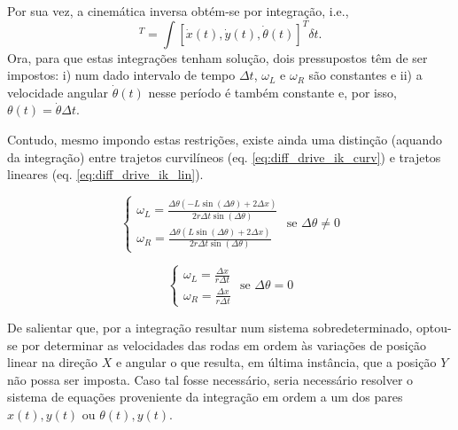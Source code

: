 \documentclass[twocolumn]{article}
\begin{document}
Por sua vez, a cinemática inversa obtém-se por integração, i.e., 
\begin{equation*}
    [x(t), y(t), \theta (t)]^T = \int [\dot{x}(t), \dot{y}(t), \dot{\theta}(t)]^T \delta t .
\end{equation*}
Ora, para que estas integrações tenham solução, dois pressupostos têm de ser impostos: i) num dado intervalo de tempo $\Delta t$, $\omega_L$ e $\omega_R$ são constantes e ii) a velocidade angular $\dot{\theta}(t)$ nesse período é também constante e, por isso, $\theta (t) = \dot{\theta} \Delta t$. 

Contudo, mesmo impondo estas restrições, existe ainda uma distinção (aquando da integração) entre trajetos curvilíneos (eq. \ref{eq:diff_drive_ik_curv}) e trajetos lineares (eq. \ref{eq:diff_drive_ik_lin}).

\begin{equation}
    \begin{cases}
        \omega_{L} = \frac{\Delta \theta \left(- L \sin{\left(\Delta \theta \right)} + 2 \Delta x\right)}{2 r \Delta t \sin{\left(\Delta \theta \right)}} \\
        \omega_{R} = \frac{\Delta \theta \left(L 
        \sin{\left(\Delta \theta \right)} + 2 \Delta x\right)}{2 r \Delta t \sin{\left(\Delta \theta \right)}}
    \end{cases}
    \text{ se } \Delta \theta \neq 0
    \label{eq:diff_drive_ik_curv}
\end{equation}

\begin{equation}
    \begin{cases}
        \omega_{L} = \frac{\Delta x}{r \Delta t} \\
        \omega_{R} = \frac{\Delta x}{r \Delta t}
    \end{cases}
    \text{ se } \Delta \theta = 0
    \label{eq:diff_drive_ik_lin}
\end{equation}

De salientar que, por a integração resultar num sistema sobredeterminado, optou-se por determinar as velocidades das rodas em ordem às variações de posição linear na direção $X$ e angular o que resulta, em última instância, que a posição $Y$ não possa ser imposta. Caso tal fosse necessário, seria necessário resolver o sistema de equações proveniente da integração em ordem a um dos pares $x(t), y(t)$ ou $\theta (t), y(t)$.
\end{document}
